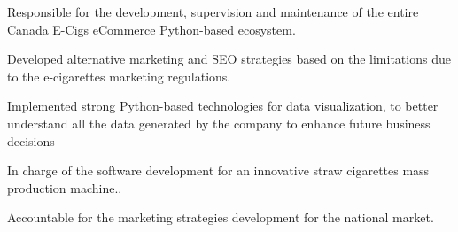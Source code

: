 \documentclass[]{morris-resume-openfont}
\begin{document}
\begin{minipage}[t]{0.5\textwidth}
\begin{tightemize}
\item Responsible for the development, supervision and maintenance of the entire Canada E-Cigs eCommerce Python-based ecosystem.
\item Developed alternative marketing and SEO strategies based on the limitations due to the e-cigarettes marketing regulations. 
\item Implemented strong Python-based technologies for data visualization, to better understand all the data generated by the company to enhance future business decisions
\end{tightemize}
\sectionsep

\begin{tightemize}
\item In charge of the software development for an innovative straw cigarettes mass production machine..
\item Accountable for the marketing strategies development for the national market.
\end{tightemize}
\sectionsep

\end{minipage} 
\end{document}
